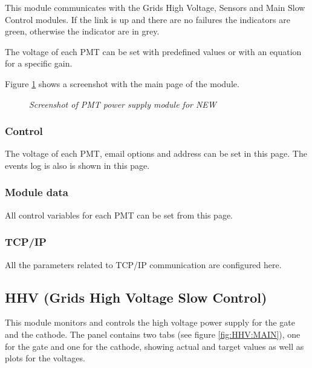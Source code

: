 This module communicates with the Grids High Voltage, Sensors and Main Slow Control modules. If the link is up and there are no failures the indicators are green, otherwise the indicator are in grey.

The voltage of each PMT can be set with predefined values or with an equation for a specific gain.

Figure \ref{fig:PMT:MAIN} shows a screenshot with the main page of the module.

\begin{figure}[ht!]
    \bigskip
    \begin{center}\leavevmode
        \caption{\textit{Screenshot of PMT power supply module for NEW}}
        \label{fig:PMT:MAIN}
    \end{center}
\end{figure}

\subsubsection*{Control}

The voltage of each PMT, email options and address can be set in this page. The events log is also is shown in this page.

\subsubsection*{Module data}

All control variables for each PMT can be set from this page.

\subsubsection*{TCP/IP}

All the parameters related to TCP/IP communication are configured here.


\subsection{HHV (Grids High Voltage Slow Control)}

This module monitors and controls the high voltage power supply for the gate and the cathode. The panel contains two tabs (see figure \ref{fig:HHV:MAIN}), one for the gate and one for the cathode, showing actual and target values as well as plots for the voltages.\\

